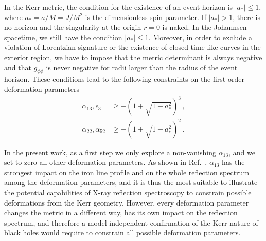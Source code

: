 \documentclass[11pt,a4paper,pdftex]{article}
\begin{document}
In the Kerr metric, the condition for the existence of an event horizon is $| a_* | \le 1$, where $a_* = a/M = J/M^2$ is the dimensionless spin parameter. If $| a_* | > 1$, there is no horizon and the singularity at the origin $r=0$ is naked. In the Johannsen spacetime, we still have the condition $| a_* | \le 1$. Moreover, in order to exclude a violation of Lorentzian signature or the existence of closed time-like curves in the exterior region, we have to impose that the metric determinant is always negative and that $g_{\phi\phi}$ is never negative for radii larger than the radius of the event horizon. These conditions lead to the following constraints on the first-order deformation parameters~\cite{johannsen_metric}
\begin{align}
\label{eq:boundary}
\alpha_{13}, \epsilon_{3} & \geq - \left( 1 + \sqrt{1 - a_*^2} \right)^3 \, , \\
\alpha_{22}, \alpha_{52} & \geq - \left(1 + \sqrt{1 - a_*^2} \right)^2 \, .
\end{align}


In the present work, as a first step we only explore a non-vanishing $\alpha_{13}$, and we set to zero all other deformation parameters. As shown in Ref.~\cite{bambi2016}, $\alpha_{13}$ has the strongest impact on the iron line profile and on the whole reflection spectrum among the deformation parameters, and it is thus the most suitable to illustrate the potential capabilities of X-ray reflection spectroscopy to constrain possible deformations from the Kerr geometry. However, every deformation parameter changes the metric in a different way, has its own impact on the reflection spectrum, and therefore a model-independent confirmation of the Kerr nature of black holes would require to constrain all possible deformation parameters.
\end{document}
